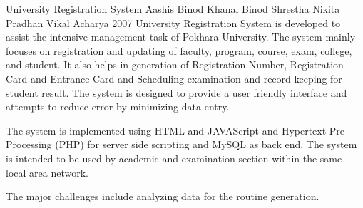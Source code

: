  \begin{conf-abstract}[]
{University Registration System }
{
Aashis Binod Khanal
Binod Shrestha
Nikita Pradhan
Vikal Acharya
}
{2007}
University Registration System is developed  to assist the intensive  management task of Pokhara University. The system mainly focuses on registration and updating of faculty, program, course, exam, college, and student. It also helps in generation of Registration Number, Registration Card and Entrance Card and Scheduling examination and record keeping for student result. The system is designed to provide a user friendly interface and attempts to reduce error by minimizing data entry.

The system is implemented using HTML and JAVAScript and Hypertext Pre-Processing (PHP) for server side scripting and MySQL as back end. The system is intended to be used by academic and examination section within the same local area network.

The major challenges include analyzing data for the routine generation.
  \end{conf-abstract}